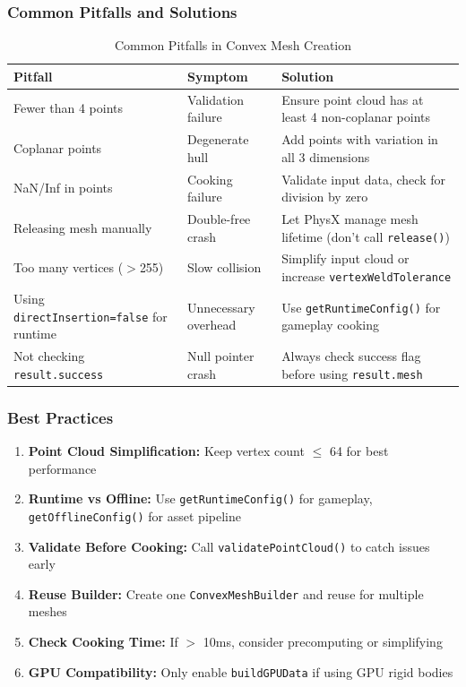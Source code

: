 \subsubsection{Common Pitfalls and Solutions}

\begin{table}[h]
\centering
\small
\begin{tabular}{|p{5cm}|p{4cm}|p{5cm}|}
\hline
\textbf{Pitfall} & \textbf{Symptom} & \textbf{Solution} \\
\hline
Fewer than 4 points & Validation failure & Ensure point cloud has at least 4 non-coplanar points \\
\hline
Coplanar points & Degenerate hull & Add points with variation in all 3 dimensions \\
\hline
NaN/Inf in points & Cooking failure & Validate input data, check for division by zero \\
\hline
Releasing mesh manually & Double-free crash & Let PhysX manage mesh lifetime (don't call \texttt{release()}) \\
\hline
Too many vertices ($>$255) & Slow collision & Simplify input cloud or increase \texttt{vertexWeldTolerance} \\
\hline
Using \texttt{directInsertion=false} for runtime & Unnecessary overhead & Use \texttt{getRuntimeConfig()} for gameplay cooking \\
\hline
Not checking \texttt{result.success} & Null pointer crash & Always check success flag before using \texttt{result.mesh} \\
\hline
\end{tabular}
\caption{Common Pitfalls in Convex Mesh Creation}
\end{table}

\subsubsection{Best Practices}

\begin{enumerate}
    \item \textbf{Point Cloud Simplification:} Keep vertex count $\leq$ 64 for best performance
    \item \textbf{Runtime vs Offline:} Use \texttt{getRuntimeConfig()} for gameplay, \texttt{getOfflineConfig()} for asset pipeline
    \item \textbf{Validate Before Cooking:} Call \texttt{validatePointCloud()} to catch issues early
    \item \textbf{Reuse Builder:} Create one \texttt{ConvexMeshBuilder} and reuse for multiple meshes
    \item \textbf{Check Cooking Time:} If $>$ 10ms, consider precomputing or simplifying
    \item \textbf{GPU Compatibility:} Only enable \texttt{buildGPUData} if using GPU rigid bodies
\end{enumerate}

